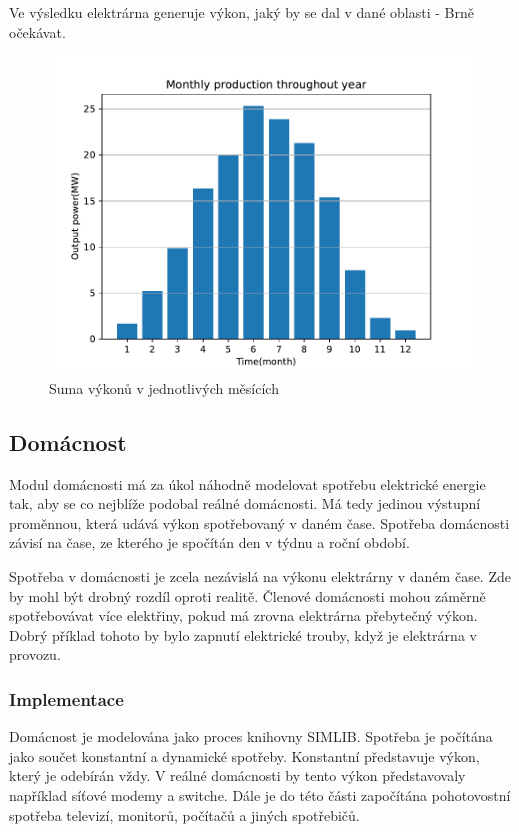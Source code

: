\documentclass[12pt,a4paper]{article}
\begin{document}
Ve výsledku elektrárna generuje výkon, jaký by se dal v dané oblasti - Brně očekávat. \cite{zilvar_2022}

\begin{figure}
\includegraphics[width=\linewidth]{img/solar_power_hist.pdf}
\caption{Suma výkonů v jednotlivých měsících}
\label{fig:solar_power_hist}
\end{figure}

\subsection{Domácnost}
Modul domácnosti má za úkol náhodně modelovat spotřebu elektrické energie tak,
aby se co nejblíže podobal reálné domácnosti.
Má tedy jedinou výstupní proměnnou, která udává výkon spotřebovaný v daném čase.
Spotřeba domácnosti závisí na čase, ze kterého je spočítán den v týdnu a roční období.

Spotřeba v domácnosti je zcela nezávislá na výkonu elektrárny v daném čase.
Zde by mohl být drobný rozdíl oproti realitě.
Členové domácnosti mohou záměrně spotřebovávat více elektřiny, pokud má zrovna elektrárna přebytečný výkon.
Dobrý příklad tohoto by bylo zapnutí elektrické trouby, když je elektrárna v provozu.

\subsubsection{Implementace}
Domácnost je modelována jako proces knihovny SIMLIB.
Spotřeba je počítána jako součet konstantní a dynamické spotřeby.
Konstantní představuje výkon, který je odebírán vždy.
V reálné domácnosti by tento výkon představovaly například síťové modemy a switche.
Dále je do této části započítána pohotovostní spotřeba televizí, monitorů, počítačů a jiných spotřebičů.
\end{document}
